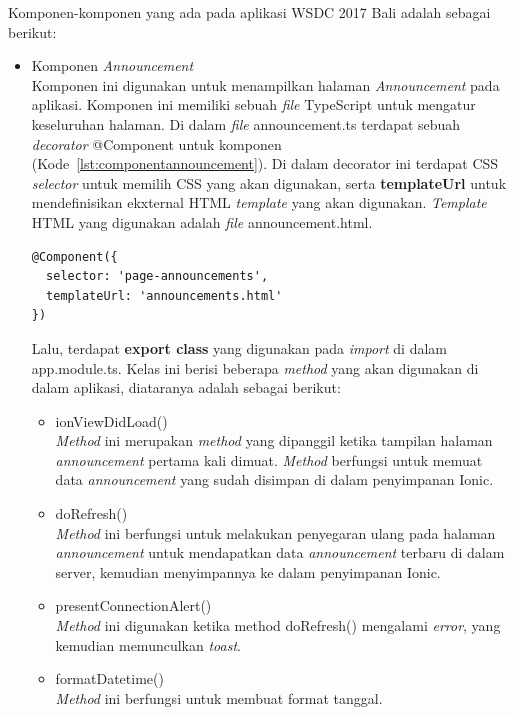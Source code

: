 Komponen-komponen yang ada pada aplikasi WSDC 2017 Bali adalah sebagai berikut:

\begin{itemize}
	\item Komponen \textit{Announcement} \\
	Komponen ini digunakan untuk menampilkan halaman \textit{Announcement} pada aplikasi. Komponen ini memiliki sebuah \textit{file} TypeScript untuk mengatur keseluruhan halaman. Di dalam \textit{file} announcement.ts terdapat sebuah \textit{decorator} @Component untuk komponen (Kode~\ref{lst:componentannouncement}). Di dalam decorator ini terdapat CSS \textit{selector} untuk memilih CSS yang akan digunakan, serta \textbf{templateUrl} untuk mendefinisikan ekxternal HTML \textit{template} yang akan digunakan. \textit{Template} HTML yang digunakan adalah \textit{file} announcement.html. 
\begin{lstlisting}[language=html, label={lst:componentannouncement}, caption=@Component pada annoncement.ts]
@Component({
  selector: 'page-announcements',
  templateUrl: 'announcements.html'
})
\end{lstlisting} 
	Lalu, terdapat \textbf{export class} yang digunakan pada \textit{import} di dalam app.module.ts. Kelas ini berisi beberapa \textit{method} yang akan digunakan di dalam aplikasi, diataranya adalah sebagai berikut:
	\begin{itemize}
		\item ionViewDidLoad() \\
		\textit{Method} ini merupakan \textit{method} yang dipanggil ketika tampilan halaman \textit{announcement} pertama kali dimuat. \textit{Method} berfungsi untuk memuat data \textit{announcement} yang sudah disimpan di dalam penyimpanan Ionic. 
		\item doRefresh() \\
		\textit{Method} ini berfungsi untuk melakukan penyegaran ulang pada halaman \textit{announcement} untuk mendapatkan data \textit{announcement} terbaru di dalam server, kemudian menyimpannya ke dalam penyimpanan Ionic.
		
		\item presentConnectionAlert() \\
		\textit{Method} ini digunakan ketika method doRefresh() mengalami \textit{error}, yang kemudian memunculkan \textit{toast}.
		\item formatDatetime() \\
		\textit{Method} ini berfungsi untuk membuat format tanggal.
	\end{itemize}


\end{itemize}
